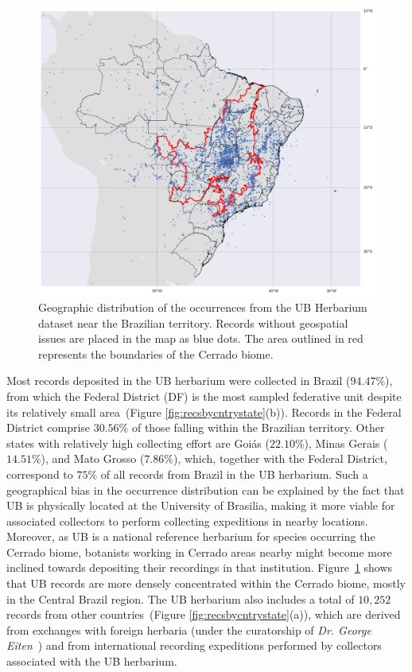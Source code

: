 \begin{figure}[t]
\centering
\includegraphics[width=\linewidth]{figures/occurrence_map.png}
\caption[Geographic distribution of the occurrences from the UB Herbarium dataset near the Brazilian territory.]{Geographic distribution of the occurrences from the UB Herbarium dataset near the Brazilian territory. Records without geospatial issues are placed in the map as blue dots. The area outlined in red represents the boundaries of the Cerrado biome.}
\label{fig:occurrence_map}
\end{figure}


Most records deposited in the UB herbarium were collected in Brazil ($94.47\%$), from which the Federal District (DF) is the most sampled federative unit despite its relatively small area~(Figure \ref{fig:recsbycntrystate}(b)).
Records in the Federal District comprise $30.56\%$ of those falling within the Brazilian territory. 
Other states with relatively high collecting effort are Goiás ($22.10\%$), Minas Gerais ($14.51\%$), and Mato Grosso ($7.86\%$), which, together with the Federal District, correspond to $75\%$ of all records from Brazil in the UB herbarium.
Such a geographical bias in the occurrence distribution can be explained by the fact that UB is physically located at the University of Brasilia, making it more viable for associated collectors to perform collecting expeditions in nearby locations.
Moreover, as UB is a national reference herbarium for species occurring the Cerrado biome, botanists working in Cerrado areas nearby might become more inclined towards depositing their recordings in that institution.
Figure~\ref{fig:occurrence_map} shows that UB records are more densely concentrated within the Cerrado biome, mostly in the Central Brazil region.
The UB herbarium also includes a total of $10,252$ records from other countries~(Figure \ref{fig:recsbycntrystate}(a)), which are derived from exchanges with foreign herbaria (under the curatorship of \textit{Dr. George Eiten}~\cite{florescer}) and from international recording expeditions performed by collectors associated with the UB herbarium.

